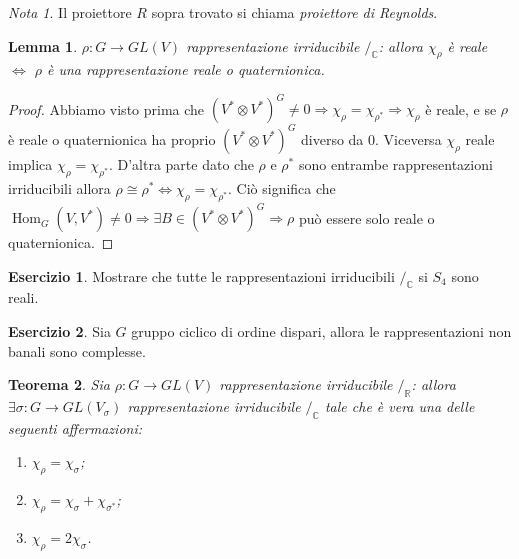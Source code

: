 \documentclass[11pt]{article}
\theoremstyle{plain}
\newtheorem{thm}{Teorema}[section]
\newtheorem{lemma}[thm]{Lemma}
\theoremstyle{definition}
\newtheorem{exercise}{Esercizio}[section]
\theoremstyle{remark}
\newtheorem*{note}{Nota}
\newcommand{\C}{\mathbb{C}}
\newcommand{\R}{\mathbb{R}}
\DeclareMathOperator{\Hom}{Hom}
\begin{document}
\begin{note}
Il proiettore $R$ sopra trovato si chiama \emph{proiettore di Reynolds}.
\end{note}


\begin{lemma} $\rho:G\rightarrow GL(V)$ rappresentazione irriducibile $/_\C$: allora $\chi_\rho$ è reale $\Leftrightarrow$ $\rho$ è una rappresentazione reale o quaternionica. 
\end{lemma}
\begin{proof} Abbiamo visto prima che $(V^*\otimes V^*)^G\neq 0\Rightarrow \chi_\rho=\chi_{\rho^*}\Rightarrow \chi_\rho$ è reale, e se $\rho$ è reale o quaternionica ha proprio $(V^*\otimes V^*)^G$ diverso da $0$. Viceversa $\chi_\rho$ reale implica $\chi_\rho=\chi_{\rho^*}$. D'altra parte dato che $\rho$ e $\rho^*$ sono entrambe rappresentazioni irriducibili allora $\rho\cong\rho^*\Leftrightarrow \chi_\rho =\chi_{\rho^*}$. Ciò significa che $\Hom_G(V,V^*)\neq 0\Rightarrow \exists B\in (V^*\otimes V^*)^G\Rightarrow \rho$ può essere solo reale o quaternionica.
\end{proof}


\begin{exercise}
	Mostrare che tutte le rappresentazioni irriducibili $/_\C$ si $S_4$ sono reali.
\end{exercise}
\begin{exercise}
	Sia $G$ gruppo ciclico di ordine dispari, allora le rappresentazioni non banali sono complesse.
\end{exercise}




\begin{thm}
Sia $\rho:G\rightarrow GL(V)$ rappresentazione irriducibile $/_\R$: allora $\exists \sigma:G\rightarrow GL(V_{\sigma})$ rappresentazione irriducibile $/_\C$ tale che è vera una delle seguenti affermazioni:
\begin{enumerate}
\item $\chi_\rho=\chi_\sigma$;
\item $\chi_\rho=\chi_\sigma+\chi_{\sigma^*}$;
\item $\chi_\rho= 2\chi_\sigma$.
\end{enumerate}
\end{thm}
\end{document}
